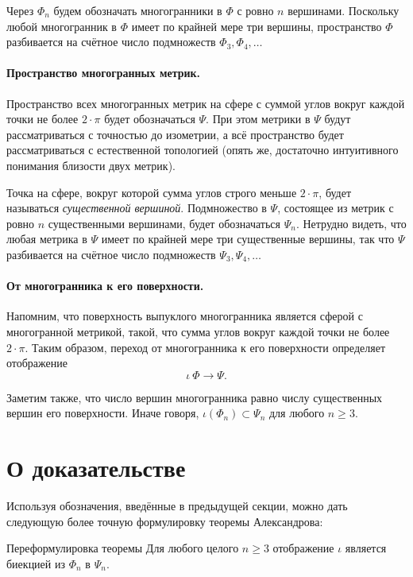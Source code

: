 \documentclass[oneside,a4paper]{article}
\begin{document}
Через $\Phi_n$ будем обозначать многогранники в $\Phi$ с ровно $n$ вершинами.
Поскольку любой многогранник в $\Phi$ имеет по крайней мере три вершины,
пространство $\Phi$ разбивается на счётное число подмножеств $\Phi_3,\Phi_4,\dots$

\paragraph{Пространство многогранных метрик.}
Пространство всех многогранных метрик на сфере с суммой углов вокруг каждой точки не более $2\cdot\pi$ будет обозначаться $\Psi$.
При этом метрики в $\Psi$ будут рассматриваться с точностью до изометрии, а всё пространство будет рассматриваться с естественной топологией (опять же, достаточно интуитивного понимания близости двух метрик).

Точка на сфере, вокруг которой сумма углов строго меньше $2\cdot\pi$, будет называться \emph{существенной вершиной}.
Подмножество в $\Psi$, состоящее из метрик с ровно $n$ существенными вершинами, будет обозначаться $\Psi_n$.
Нетрудно видеть, что любая метрика в $\Psi$ имеет по крайней мере три существенные вершины,
так что $\Psi$ разбивается на счётное число подмножеств $\Psi_3,\Psi_4,\dots$

\paragraph{От многогранника к его поверхности.}
Напомним, что поверхность выпуклого многогранника является сферой с многогранной метрикой, такой, что сумма углов вокруг каждой точки не более $2\cdot\pi$.
Таким образом, переход от многогранника к его поверхности определяет отображение 
\[\iota\:\Phi\to \Psi.\]

Заметим также, что число вершин многогранника равно числу существенных вершин его поверхности.
Иначе говоря, $\iota(\Phi_n)\subset \Psi_n$ для любого $n\ge 3$.

\section{О доказательстве}

Используя обозначения, введённые в предыдущей секции, можно дать следующую более точную формулировку теоремы Александрова:

\begin{thm}{Переформулировка теоремы}
Для любого целого $n\ge 3$
отображение $\iota$ является биекцией из $\Phi_n$ в $\Psi_n$.
\end{thm}
\end{document}
